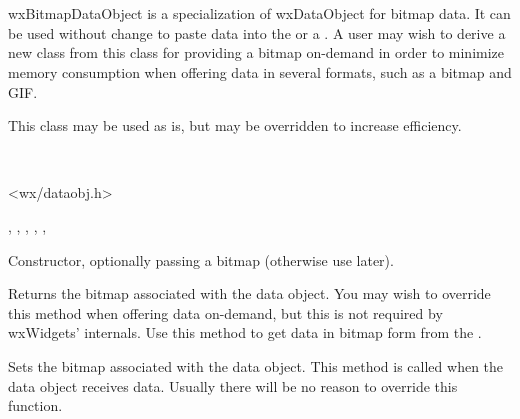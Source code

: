 \section{}\label{wxbitmapdataobject}

wxBitmapDataObject is a specialization of wxDataObject for bitmap data. It can
be used without change to paste data into the 
 or a . A
user may wish to derive a new class from this class for providing a bitmap
on-demand in order to minimize memory consumption when offering data in several
formats, such as a bitmap and GIF.



This class may be used as is, but 
 may be overridden to increase
efficiency.


\\


<wx/dataobj.h>


, 
, 
, 
, 
, 


Constructor, optionally passing a bitmap (otherwise use 
 later).

\label{wxbitmapdataobjectgetbitmap}


Returns the bitmap associated with the data object. You may wish to override
this method when offering data on-demand, but this is not required by
wxWidgets' internals. Use this method to get data in bitmap form from
the .

\label{wxbitmapdataobjectsetbitmap}


Sets the bitmap associated with the data object. This method is called when the
data object receives data. Usually there will be no reason to override this
function.

